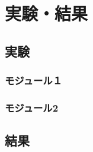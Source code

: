 \section{実験・結果}\label{result}

\subsection{実験}

\subsubsection*{モジュール１}

\subsubsection*{モジュール2}

\subsection{結果}
